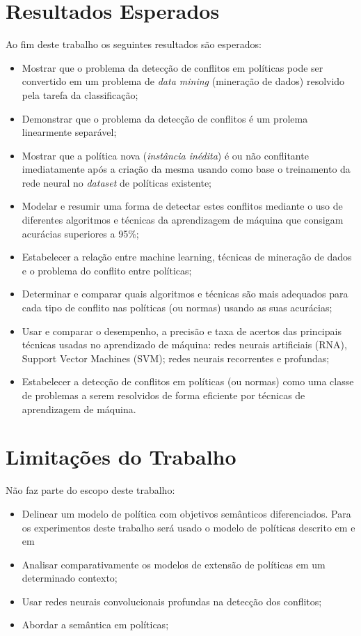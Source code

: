 \documentclass[
	12pt,				%
	openright,			%
	twoside,			%
	a4paper,			%
	english,			%
	french,				%
	spanish,			%
	brazil				%
	]{abntex2}
\begin{document}
\section{Resultados Esperados}\label{resultados_esperados}
Ao fim deste trabalho os seguintes resultados são esperados:
\begin{itemize}
	\item Mostrar que o problema da detecção de conflitos em políticas pode ser convertido em um problema de \textit{data mining} (mineração de dados) resolvido pela tarefa da classificação;
	\item Demonstrar que o problema da detecção de conflitos é um prolema linearmente separável;
	\item Mostrar que a política nova (\textit{instância inédita})  é ou não conflitante imediatamente após a criação da mesma usando como base o treinamento da rede neural no \textit{dataset} de políticas existente;
	\item Modelar e resumir uma forma de detectar estes conflitos mediante o uso de diferentes algoritmos e técnicas da aprendizagem de máquina que consigam acurácias superiores a 95\%;
	\item Estabelecer a relação entre machine learning, técnicas de mineração de dados e o problema do conflito entre políticas;
	\item Determinar e comparar quais algoritmos e técnicas são mais adequados para cada tipo de conflito nas políticas (ou normas) usando as suas acurácias;
	\item Usar e comparar o desempenho, a precisão e taxa de acertos das principais técnicas usadas no aprendizado de máquina: redes neurais artificiais (RNA), Support Vector Machines (SVM); redes neurais recorrentes e profundas;
	\item Estabelecer a detecção de conflitos em políticas (ou normas) como uma  classe de problemas a serem resolvidos de forma eficiente por técnicas de aprendizagem de máquina.
\end{itemize} 

\section{Limitações do Trabalho}\label{limitacoes}
Não faz parte do escopo deste trabalho:
\begin{itemize}
	\item Delinear um modelo de política com objetivos semânticos diferenciados. Para os experimentos deste trabalho será usado o modelo de políticas descrito em  e em 
	\item Analisar comparativamente os modelos de extensão de políticas em um determinado contexto;
	\item Usar redes neurais convolucionais profundas na detecção dos conflitos;
	\item Abordar a semântica em políticas;	
\end{itemize} 
\end{document}
